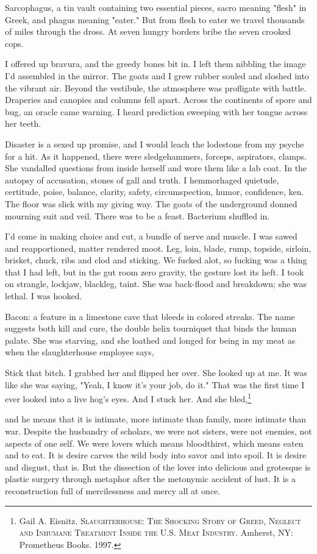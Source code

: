 \documentclass[
]{memoir}
\begin{document}
Sarcophagus, a tin vault containing two essential pieces, sacro meaning
"flesh" in Greek, and phagus meaning "eater." But from flesh to eater we
travel thousands of miles through the dross. At seven hungry borders
bribe the seven crooked cops.

I offered up bravura, and the greedy bones bit in. I left them nibbling
the image I'd assembled in the mirror. The goats and I grew rubber
souled and sloshed into the vibrant air. Beyond the vestibule, the
atmosphere was profligate with battle. Draperies and canopies and
columns fell apart. Across the continents of spore and bug, an oracle
came warning. I heard prediction sweeping with her tongue across her
teeth.

Disaster is a sexed up promise, and I would leach the lodestone from my
psyche for a hit. As it happened, there were sledgehammers, forceps,
aspirators, clamps. She vandalled questions from inside herself and wore
them like a lab coat. In the autopsy of accusation, stones of gall and
truth. I hemmorhaged quietude, certitude, poise, balance, clarity,
safety, circumspection, humor, confidence, ken. The floor was slick with
my giving way. The goats of the underground donned mourning suit and
veil. There was to be a feast. Bacterium shuffled in.

I'd come in making choice and cut, a bundle of nerve and muscle. I was
sawed and reapportioned, matter rendered moot. Leg, loin, blade, rump,
topside, sirloin, brisket, chuck, ribs and clod and sticking. We fucked
alot, so fucking was a thing that I had left, but in the gut room zero
gravity, the gesture lost its heft. I took on strangle, lockjaw,
blackleg, taint. She was back-flood and breakdown; she was lethal. I was
hooked.

Bacon: a feature in a limestone cave that bleeds in colored streaks. The
name suggests both kill and cure, the double helix tourniquet that binds
the human palate. She was starving, and she loathed and longed for being
in my meat as when the slaughterhouse employee says,

Stick that bitch. I grabbed her and flipped her over. She looked up at
me. It was like she was saying, "Yeah, I know it's your job, do it."
That was the first time I ever looked into a live hog's eyes. And I
stuck her. And she bled,\footnote{Gail A. Eisnitz.
  \textsc{Slaughterhouse: The Shocking Story of Greed, Neglect and
  Inhumane Treatment Inside the U.S. Meat Industry}. Amherst, NY:
  Prometheus Books. 1997.}

and he means that it is intimate, more intimate than family, more
intimate than war. Despite the husbandry of scholars, we were not
sisters, were not enemies, not aspects of one self. We were lovers which
means bloodthirst, which means eaten and to eat. It is desire carves the
wild body into savor and into spoil. It is desire and disgust, that is.
But the dissection of the lover into delicious and grotesque is plastic
surgery through metaphor after the metonymic accident of lust. It is a
reconstruction full of mercilessness and mercy all at once.
\end{document}
